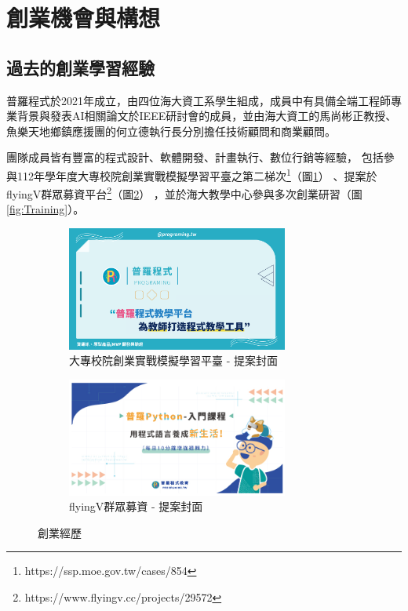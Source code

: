 \section{創業機會與構想}
\subsection{過去的創業學習經驗}

普羅程式於2021年成立，由四位海大資工系學生組成，成員中有具備全端工程師專業背景與發表AI相關論文於IEEE研討會的成員，並由海大資工的馬尚彬正教授、魚樂天地鄉鎮應援團的何立德執行長分別擔任技術顧問和商業顧問。

團隊成員皆有豐富的程式設計、軟體開發、計畫執行、數位行銷等經驗，
包括參與112年學年度大專校院創業實戰模擬學習平臺之第二梯次\footnote{https://ssp.moe.gov.tw/cases/854}（圖\ref{fig:experience-1}）
、提案於flyingV群眾募資平台\footnote{https://www.flyingv.cc/projects/29572}（圖\ref{fig:experience-2}）
，並於海大教學中心參與多次創業研習（圖\ref{fig:Training}）。

\begin{figure}[H]
  \centering
  \begin{subfigure}{0.45\linewidth}
    \centering
    \includegraphics[width=0.8\textwidth]{images/maker.png}
    \caption{大專校院創業實戰模擬學習平臺 - 提案封面}
    \label{fig:experience-1}
  \end{subfigure}
    \begin{subfigure}{0.45\linewidth}
    \centering
    \includegraphics[width=0.8\textwidth]{images/flyingv.jpg}
    \caption{flyingV群眾募資 - 提案封面}
    \label{fig:experience-2}
  \end{subfigure}
  \caption{創業經歷}
  \label{fig:Experience}
\end{figure}


